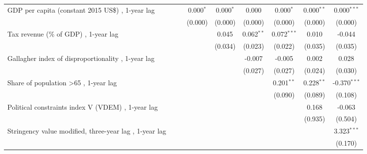 \begin{table}[htbp]
\begin{tabular}{lcccccccc}
      GDP per capita (constant 2015 US\$) , 1-year lag                         &         &         & 0.000$^{*}$ & 0.000$^{*}$ & 0.000         & 0.000$^{*}$   & 0.000$^{**}$   & 0.000$^{***}$\\   
                                                                               &         &         & (0.000)     & (0.000)     & (0.000)       & (0.000)       & (0.000)        & (0.000)\\   
      Tax revenue (\% of GDP) , 1-year lag                                     &         &         &             & 0.045       & 0.062$^{**}$  & 0.072$^{***}$ & 0.010          & -0.044\\   
                                                                               &         &         &             & (0.034)     & (0.023)       & (0.022)       & (0.035)        & (0.035)\\   
      Gallagher index of disproportionality , 1-year lag                       &         &         &             &             & -0.007        & -0.005        & 0.002          & 0.028\\   
                                                                               &         &         &             &             & (0.027)       & (0.027)       & (0.024)        & (0.030)\\   
      Share of population >65 , 1-year lag                                     &         &         &             &             &               & 0.201$^{**}$  & 0.228$^{**}$   & -0.370$^{***}$\\   
                                                                               &         &         &             &             &               & (0.090)       & (0.089)        & (0.108)\\   
      Political constraints index V (VDEM) , 1-year lag                        &         &         &             &             &               &               & 0.168          & -0.063\\   
                                                                               &         &         &             &             &               &               & (0.935)        & (0.504)\\   
      Stringency value modified, three-year lag , 1-year lag                   &         &         &             &             &               &               &                & 3.323$^{***}$\\   
                                                                               &         &         &             &             &               &               &                & (0.170)\\   

\end{tabular}
\end{table}
